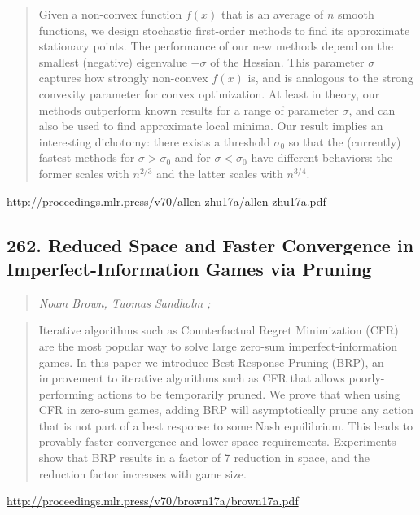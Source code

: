 \documentclass{article}
\begin{document}
\begin{quote}
    Given a non-convex function $f(x)$ that is an average of $n$ smooth functions, we design stochastic first-order methods to find its approximate stationary points. The performance of our new methods depend on the smallest (negative) eigenvalue $-\sigma$ of the Hessian. This parameter $\sigma$ captures how strongly non-convex $f(x)$ is, and is analogous to the strong convexity parameter for convex optimization. At least in theory, our methods outperform known results for a range of parameter $\sigma$, and can also be used to find approximate local minima. Our result implies an interesting dichotomy: there exists a threshold $\sigma_0$ so that the (currently) fastest methods for $\sigma>\sigma_0$ and for $\sigma<\sigma_0$ have different behaviors: the former scales with $n^{2/3}$ and the latter scales with $n^{3/4}$.  \end{quote}

\href{http://proceedings.mlr.press/v70/allen-zhu17a/allen-zhu17a.pdf}{http://proceedings.mlr.press/v70/allen-zhu17a/allen-zhu17a.pdf}

\subsection{262. Reduced Space and Faster Convergence in Imperfect-Information Games via Pruning}

\begin{quote}
\footnotesize{\textit{Noam Brown, Tuomas Sandholm ;}}
\end{quote}

\begin{quote}
    Iterative algorithms such as Counterfactual Regret Minimization (CFR) are the most popular way to solve large zero-sum imperfect-information games. In this paper we introduce Best-Response Pruning (BRP), an improvement to iterative algorithms such as CFR that allows poorly-performing actions to be temporarily pruned. We prove that when using CFR in zero-sum games, adding BRP will asymptotically prune any action that is not part of a best response to some Nash equilibrium. This leads to provably faster convergence and lower space requirements. Experiments show that BRP results in a factor of 7 reduction in space, and the reduction factor increases with game size.  \end{quote}

\href{http://proceedings.mlr.press/v70/brown17a/brown17a.pdf}{http://proceedings.mlr.press/v70/brown17a/brown17a.pdf}
\end{document}
